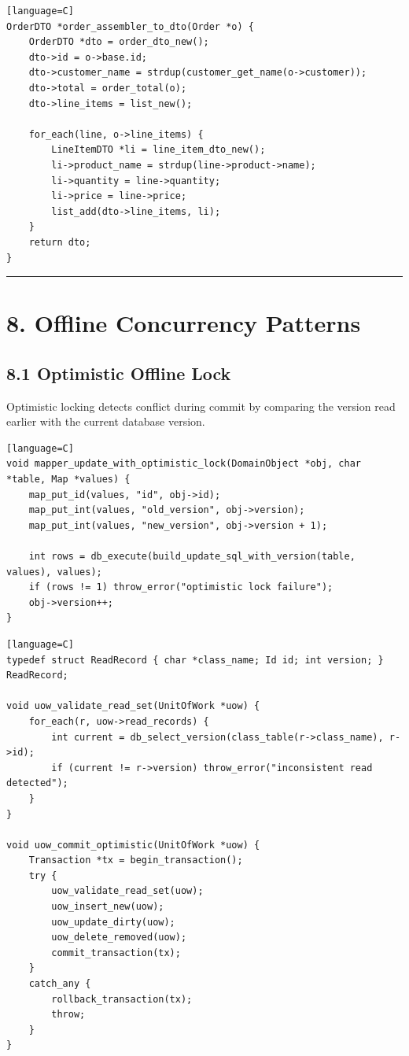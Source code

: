 \documentclass[11pt]{article}
\begin{document}
\begin{verbatim}[language=C]
OrderDTO *order_assembler_to_dto(Order *o) {
    OrderDTO *dto = order_dto_new();
    dto->id = o->base.id;
    dto->customer_name = strdup(customer_get_name(o->customer));
    dto->total = order_total(o);
    dto->line_items = list_new();

    for_each(line, o->line_items) {
        LineItemDTO *li = line_item_dto_new();
        li->product_name = strdup(line->product->name);
        li->quantity = line->quantity;
        li->price = line->price;
        list_add(dto->line_items, li);
    }
    return dto;
}
\end{verbatim}

\begin{center}\rule{0.5\linewidth}{0.5pt}\end{center}

\section{8. Offline Concurrency
Patterns}\label{offline-concurrency-patterns}

\subsection{8.1 Optimistic Offline Lock}\label{optimistic-offline-lock}

Optimistic locking detects conflict during commit by comparing the
version read earlier with the current database version.

\begin{verbatim}[language=C]
void mapper_update_with_optimistic_lock(DomainObject *obj, char *table, Map *values) {
    map_put_id(values, "id", obj->id);
    map_put_int(values, "old_version", obj->version);
    map_put_int(values, "new_version", obj->version + 1);

    int rows = db_execute(build_update_sql_with_version(table, values), values);
    if (rows != 1) throw_error("optimistic lock failure");
    obj->version++;
}
\end{verbatim}

\begin{verbatim}[language=C]
typedef struct ReadRecord { char *class_name; Id id; int version; } ReadRecord;

void uow_validate_read_set(UnitOfWork *uow) {
    for_each(r, uow->read_records) {
        int current = db_select_version(class_table(r->class_name), r->id);
        if (current != r->version) throw_error("inconsistent read detected");
    }
}

void uow_commit_optimistic(UnitOfWork *uow) {
    Transaction *tx = begin_transaction();
    try {
        uow_validate_read_set(uow);
        uow_insert_new(uow);
        uow_update_dirty(uow);
        uow_delete_removed(uow);
        commit_transaction(tx);
    }
    catch_any {
        rollback_transaction(tx);
        throw;
    }
}
\end{verbatim}
\end{document}
